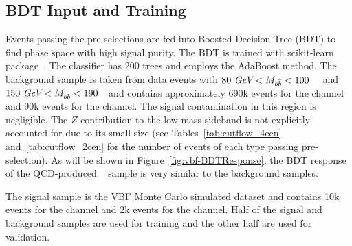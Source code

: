 \label{sec:vbf-bdt}

\subsection{BDT Input and Training}
Events passing the pre-selections are fed into Boosted Decision Tree (BDT) to find phase space with high signal purity.
The BDT is trained with scikit-learn package~\cite{scikit-learn}.
The classifier has 200 trees and employs the AdaBoost method.
The background sample is taken from data events with $80~\textit{GeV} < M_{b\bar{b}} <100$~\GeV~
and $150~\textit{GeV}<M_{b\bar{b}}<190$~\GeV~and contains approximately 690k events for
the \fourcentral channel and 90k events for the \twocentral channel.
The signal contamination in this region is negligible.
The $Z$ contribution to the low-mass sideband is not explicitly accounted
for due to its small size (see Tables~\ref{tab:cutflow_4cen}
and~\ref{tab:cutflow_2cen} for the number of events of each type passing pre-selection).
As will be shown in Figure~\ref{fig:vbf-BDTResponse},
the BDT response of the QCD-produced \zjets~ sample is very similar to the background samples. 

The signal sample is the VBF Monte Carlo simulated dataset and
contains 10k events for the \fourcentral channel and 2k events for
the \twocentral channel.  Half of the signal and background samples are
used for training and the other half are used for validation.

